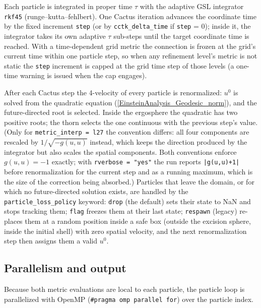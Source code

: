\documentclass{article}
\begin{document}
Each particle is integrated in proper time $\tau$ with the adaptive
GSL integrator \texttt{rkf45} (runge--kutta--fehlbert).  One Cactus
iteration advances the coordinate time by the fixed increment
\texttt{step} (or by \texttt{cctk\_delta\_time} if \texttt{step} = 0);
inside it, the integrator takes its own adaptive $\tau$ sub-steps until
the target coordinate time is reached.  With a time-dependent grid
metric the connection is frozen at the grid's current time within one
particle step, so when any refinement level's metric is not static the
\texttt{step} increment is capped at the grid time step of those
levels (a one-time warning is issued when the cap engages).

After each Cactus step the 4-velocity of every particle is
renormalized: $u^0$ is solved from the quadratic equation
(\ref{EinsteinAnalysis_Geodesic_norm}), and the future-directed root is
selected.  Inside the ergosphere the quadratic has two positive roots;
the thorn selects the one continuous with the previous step's value.
(Only for \texttt{metric\_interp = l27} the convention differs: all four
components are rescaled by $1/\sqrt{-g(u,u)}$ instead, which keeps the
direction produced by the integrator but also scales the spatial
components.  Both conventions enforce $g(u,u)=-1$ exactly; with
\texttt{rverbose = "yes"} the run reports \texttt{|g(u,u)+1|} before
renormalization for the current step and as a running maximum, which is
the size of the correction being absorbed.)
Particles that leave the domain, or for which no future-directed
solution exists, are handled by the \texttt{particle\_loss\_policy}
keyword: \texttt{drop} (the default) sets their state to NaN and stops
tracking them; \texttt{flag} freezes them at their last state;
\texttt{respawn} (legacy) re-places them at a random position inside a
safe box (outside the excision sphere, inside the initial shell) with
zero spatial velocity, and the next renormalization step then assigns
them a valid $u^0$.

\subsection{Parallelism and output}

Because both metric evaluations are local to each particle, the
particle loop is parallelized with OpenMP
(\texttt{\#pragma omp parallel for}) over the particle index.
\end{document}

